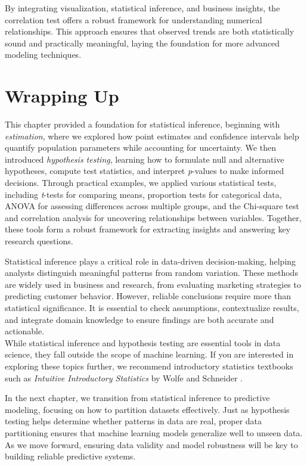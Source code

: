 \documentclass[
]{book}
\theoremstyle{definition}
\theoremstyle{definition}
\theoremstyle{definition}
\theoremstyle{definition}
\theoremstyle{remark}
\begin{document}
By integrating visualization, statistical inference, and business insights, the correlation test offers a robust framework for understanding numerical relationships. This approach ensures that observed trends are both statistically sound and practically meaningful, laying the foundation for more advanced modeling techniques.

\section{Wrapping Up}\label{wrapping-up}

This chapter provided a foundation for statistical inference, beginning with \emph{estimation}, where we explored how point estimates and confidence intervals help quantify population parameters while accounting for uncertainty. We then introduced \emph{hypothesis testing}, learning how to formulate null and alternative hypotheses, compute test statistics, and interpret \emph{p}-values to make informed decisions. Through practical examples, we applied various statistical tests, including \emph{t}-tests for comparing means, proportion tests for categorical data, ANOVA for assessing differences across multiple groups, and the Chi-square test and correlation analysis for uncovering relationships between variables. Together, these tools form a robust framework for extracting insights and answering key research questions.

Statistical inference plays a critical role in data-driven decision-making, helping analysts distinguish meaningful patterns from random variation. These methods are widely used in business and research, from evaluating marketing strategies to predicting customer behavior. However, reliable conclusions require more than statistical significance. It is essential to check assumptions, contextualize results, and integrate domain knowledge to ensure findings are both accurate and actionable.\\
While statistical inference and hypothesis testing are essential tools in data science, they fall outside the scope of machine learning. If you are interested in exploring these topics further, we recommend introductory statistics textbooks such as \emph{Intuitive Introductory Statistics} by Wolfe and Schneider \citep{wolfe2017intuitive}.

In the next chapter, we transition from statistical inference to predictive modeling, focusing on how to partition datasets effectively. Just as hypothesis testing helps determine whether patterns in data are real, proper data partitioning ensures that machine learning models generalize well to unseen data. As we move forward, ensuring data validity and model robustness will be key to building reliable predictive systems.
\end{document}
